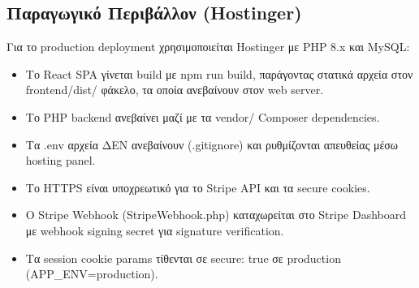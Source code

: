 \documentclass[12pt,a4paper]{report}
\begin{document}
\subsection{Παραγωγικό Περιβάλλον (Hostinger)}
Για το \textenglish{production deployment} χρησιμοποιείται \textenglish{Hostinger} με \textenglish{PHP 8.x} και \textenglish{MySQL}:
\begin{itemize}[label=•]
    \item Το \textenglish{React SPA} γίνεται \textenglish{build} με \textenglish{npm run build}, παράγοντας στατικά αρχεία στον \textenglish{frontend/dist/} φάκελο, τα οποία ανεβαίνουν στον \textenglish{web server}.
    \item Το \textenglish{PHP backend} ανεβαίνει μαζί με τα \textenglish{vendor/} \textenglish{Composer dependencies}.
    \item Τα \textenglish{.env} αρχεία ΔΕΝ ανεβαίνουν (\textenglish{.gitignore}) και ρυθμίζονται απευθείας μέσω \textenglish{hosting panel}.
    \item Το \textenglish{HTTPS} είναι υποχρεωτικό για το \textenglish{Stripe API} και τα \textenglish{secure cookies}.
    \item Ο \textenglish{Stripe Webhook} (\textenglish{StripeWebhook.php}) καταχωρείται στο \textenglish{Stripe Dashboard} με \textenglish{webhook signing secret} για \textenglish{signature verification}.
    \item Τα \textenglish{session cookie params} τίθενται σε \textenglish{secure: true} σε \textenglish{production} (\textenglish{APP\_ENV=production}).
\end{itemize}
\end{document}
